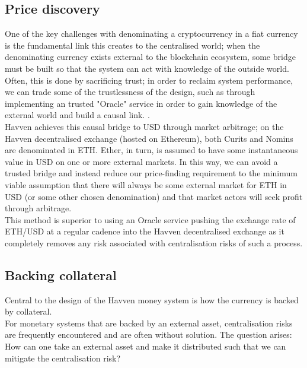 \subsection{Price discovery}

One of the key challenges with denominating a cryptocurrency in a fiat currency is the fundamental link this creates to the centralised world; when the denominating currency exists external to the blockchain ecosystem, some bridge must be built so that the system can act with knowledge of the outside world. Often, this is done by sacrificing trust; in order to reclaim system performance, we can trade some of the trustlessness of the design, such as through implementing an trusted "Oracle" service in order to gain knowledge of the external world and build a causal link. \cite{brooks2017blog}.\\

\noindent Havven achieves this causal bridge to USD through market arbitrage; on the Havven decentralised exchange (hosted on Ethereum), both Curits and Nomins are denominated in ETH. Ether, in turn, is assumed to have some instantaneous value in USD on one or more external markets. In this way, we can avoid a trusted bridge and instead reduce our price-finding requirement to the minimum viable assumption that there will always be some external market for ETH in USD (or some other chosen denomination) and that market actors will seek profit through arbitrage. \\

\noindent This method is superior to using an Oracle service pushing the exchange rate of ETH/USD at a regular cadence into the Havven decentralised exchange as it completely removes any risk associated with centralisation risks of such a process. \\

\subsection{Backing collateral}

Central to the design of the Havven money system is how the currency is backed by collateral. \\

\noindent For monetary systems that are backed by an external asset, centralisation risks are frequently encountered and are often without solution. The question arises: \\

\noindent How can one take an external asset and make it distributed such that we can mitigate the centralisation risk? \\

